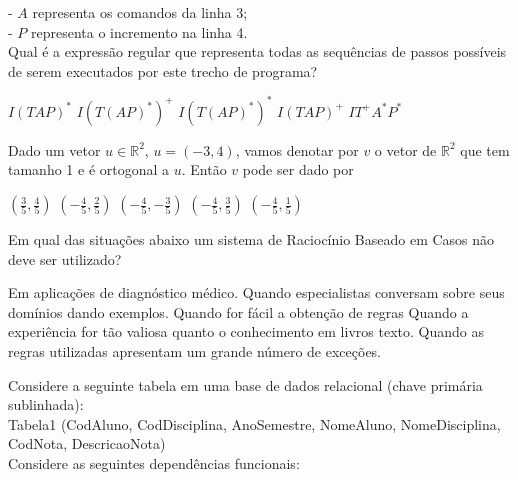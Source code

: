 \documentclass[12pt, addpoints]{exam}
\begin{document}
\begin{questions}
- \( A \) representa os comandos da linha 3;\\

- \( P \) representa o incremento na linha 4.\\



Qual é a expressão regular que representa todas as sequências de passos possíveis de serem executados por este trecho de programa?
\begin{choices}
\choice \( I(TAP)^* \)
\choice \( I(T(AP)^*)^+ \)
\choice \( I(T(AP)^*)^* \)
\choice \( I(TAP)^+ \)
\choice \( IT^+A^*P^* \)
\end{choices}

\question

Dado um vetor \( u \in \mathbb{R}^2 \), \( u = (-3, 4) \), vamos denotar por \( v \) o vetor de \( \mathbb{R}^2 \) que tem tamanho 1 e é ortogonal a \( u \). Então \( v \) pode ser dado por


\begin{choices}
\choice \( \left( \frac{3}{5}, \frac{4}{5} \right) \)
\choice \( \left( -\frac{4}{5}, \frac{2}{5} \right) \)
\choice \( \left( -\frac{4}{5}, -\frac{3}{5} \right) \)
\choice \( \left( -\frac{4}{5}, \frac{3}{5} \right) \)
\choice \( \left( -\frac{4}{5}, \frac{1}{5} \right) \)
\end{choices}

\question

Em qual das situações abaixo um sistema de Raciocínio Baseado em Casos não deve ser utilizado?


\begin{choices}
\choice Em aplicações de diagnóstico médico.
\choice Quando especialistas conversam sobre seus domínios dando exemplos.
\choice Quando for fácil a obtenção de regras
\choice Quando a experiência for tão valiosa quanto o conhecimento em livros texto.
\choice Quando as regras utilizadas apresentam um grande número de exceções.
\end{choices}

\question

Considere a seguinte tabela em uma base de dados relacional (chave primária sublinhada):\\

Tabela1 (CodAluno, CodDisciplina, AnoSemestre, NomeAluno, NomeDisciplina, CodNota, DescricaoNota)\\

Considere as seguintes dependências funcionais:

\begin{itemize}


\end{itemize}
\end{questions}
\end{document}
